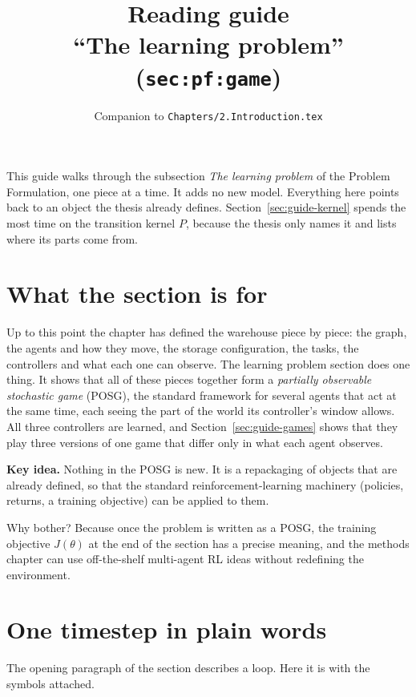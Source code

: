 \documentclass[11pt,a4paper]{article}
\title{Reading guide\\[2pt]\large ``The learning problem'' (\texttt{sec:pf:game})}
\author{Companion to \texttt{Chapters/2.Introduction.tex}}
\date{}
\newcommand{\idea}[1]{\par\smallskip\noindent\colorbox{boxbg}{\parbox{\dimexpr\linewidth-2\fboxsep}{\textbf{Key idea.} #1}}\par\smallskip}
\begin{document}
\maketitle

\noindent This guide walks through the subsection \emph{The learning
problem} of the Problem Formulation, one piece at a time. It adds no new
model. Everything here points back to an object the thesis already
defines. Section~\ref{sec:guide-kernel} spends the most time on the
transition kernel $P$, because the thesis only names it and lists where
its parts come from.

\tableofcontents

\section{What the section is for}

Up to this point the chapter has defined the warehouse piece by piece:
the graph, the agents and how they move, the storage configuration, the
tasks, the controllers and what each one can observe. The learning
problem section does one thing. It shows that all of these pieces
together form a \emph{partially observable stochastic game} (POSG), the
standard framework for several agents that act at the same time, each
seeing the part of the world its controller's window allows. All three
controllers are learned, and Section~\ref{sec:guide-games} shows that they
play three versions of one game that differ only in what each agent
observes.

\idea{Nothing in the POSG is new. It is a repackaging of objects that are
already defined, so that the standard reinforcement-learning machinery
(policies, returns, a training objective) can be applied to them.}

Why bother? Because once the problem is written as a POSG, the training
objective $J(\theta)$ at the end of the section has a precise meaning,
and the methods chapter can use off-the-shelf multi-agent RL ideas
without redefining the environment.

\section{One timestep in plain words}
\label{sec:guide-loop}

The opening paragraph of the section describes a loop. Here it is with
the symbols attached.
\end{document}
